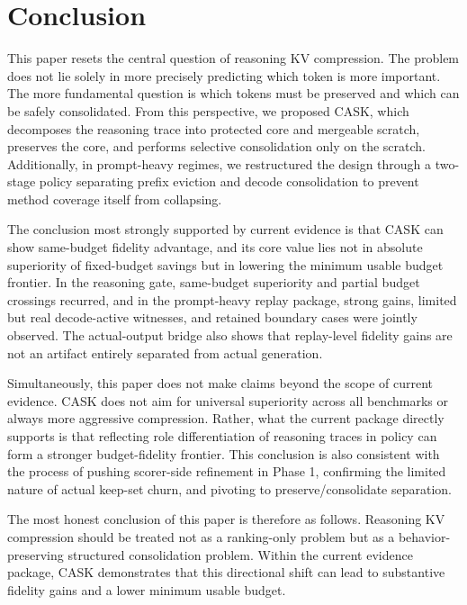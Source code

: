 \section{Conclusion}


This paper resets the central question of reasoning KV compression. The problem does not lie solely in more precisely predicting which token is more important. The more fundamental question is which tokens must be preserved and which can be safely consolidated. From this perspective, we proposed CASK, which decomposes the reasoning trace into protected core and mergeable scratch, preserves the core, and performs selective consolidation only on the scratch. Additionally, in prompt-heavy regimes, we restructured the design through a two-stage policy separating prefix eviction and decode consolidation to prevent method coverage itself from collapsing.


The conclusion most strongly supported by current evidence is that CASK can show same-budget fidelity advantage, and its core value lies not in absolute superiority of fixed-budget savings but in lowering the minimum usable budget frontier. In the reasoning gate, same-budget superiority and partial budget crossings recurred, and in the prompt-heavy replay package, strong gains, limited but real decode-active witnesses, and retained boundary cases were jointly observed. The actual-output bridge also shows that replay-level fidelity gains are not an artifact entirely separated from actual generation.


Simultaneously, this paper does not make claims beyond the scope of current evidence. CASK does not aim for universal superiority across all benchmarks or always more aggressive compression. Rather, what the current package directly supports is that reflecting role differentiation of reasoning traces in policy can form a stronger budget-fidelity frontier. This conclusion is also consistent with the process of pushing scorer-side refinement in Phase 1, confirming the limited nature of actual keep-set churn, and pivoting to preserve/consolidate separation.


The most honest conclusion of this paper is therefore as follows. Reasoning KV compression should be treated not as a ranking-only problem but as a behavior-preserving structured consolidation problem. Within the current evidence package, CASK demonstrates that this directional shift can lead to substantive fidelity gains and a lower minimum usable budget.


\appendix

